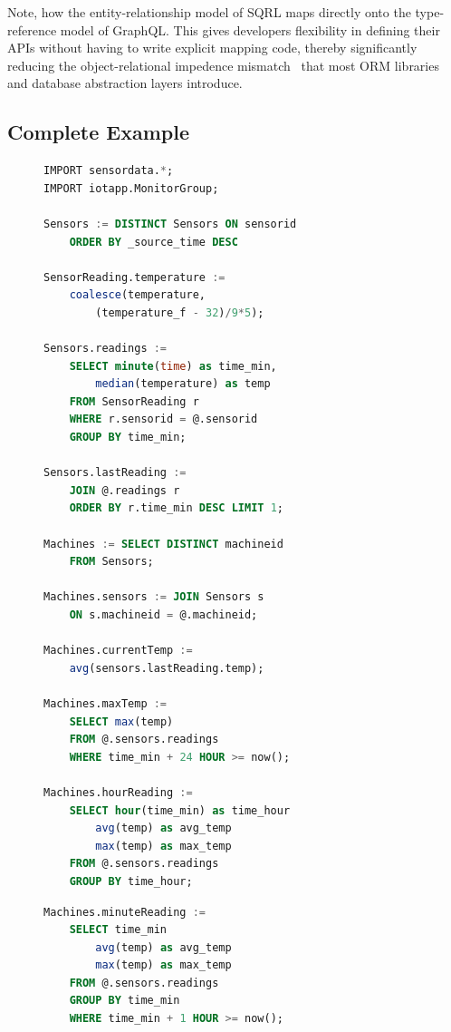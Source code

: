 \documentclass[	DIV=calc,%
							paper=letter,%
							fontsize=11pt,%
							twocolumn]{scrartcl}	 					%
\begin{document}
Note, how the entity-relationship model of SQRL maps directly onto the type-reference model of GraphQL. This gives developers flexibility in defining their APIs without having to write explicit mapping code, thereby significantly reducing the object-relational impedence mismatch~\cite{} that most ORM libraries and database abstraction layers introduce.

\subsection{Complete Example}

\begin{figure}[!ht]
    \begin{minipage}[l]{1.0\columnwidth}
        \centering
        \begin{lstlisting}[language=SQL]
IMPORT sensordata.*;
IMPORT iotapp.MonitorGroup;

Sensors := DISTINCT Sensors ON sensorid
    ORDER BY _source_time DESC

SensorReading.temperature :=
    coalesce(temperature,
        (temperature_f - 32)/9*5);

Sensors.readings :=
    SELECT minute(time) as time_min,
        median(temperature) as temp
    FROM SensorReading r
    WHERE r.sensorid = @.sensorid
    GROUP BY time_min;

Sensors.lastReading :=
    JOIN @.readings r
    ORDER BY r.time_min DESC LIMIT 1;

Machines := SELECT DISTINCT machineid
    FROM Sensors;

Machines.sensors := JOIN Sensors s
    ON s.machineid = @.machineid;

Machines.currentTemp :=
    avg(sensors.lastReading.temp);

Machines.maxTemp :=
    SELECT max(temp)
    FROM @.sensors.readings
    WHERE time_min + 24 HOUR >= now();

Machines.hourReading :=
    SELECT hour(time_min) as time_hour
        avg(temp) as avg_temp
        max(temp) as max_temp
    FROM @.sensors.readings
    GROUP BY time_hour;
    \end{lstlisting}
    \end{minipage}
    \hfill{}
    \begin{minipage}[r][][b]{1.0\columnwidth}
    \centering
    \begin{lstlisting}[language=SQL]
Machines.minuteReading :=
    SELECT time_min
        avg(temp) as avg_temp
        max(temp) as max_temp
    FROM @.sensors.readings
    GROUP BY time_min
    WHERE time_min + 1 HOUR >= now();


\end{lstlisting}
\end{minipage}
\end{figure}
\end{document}
